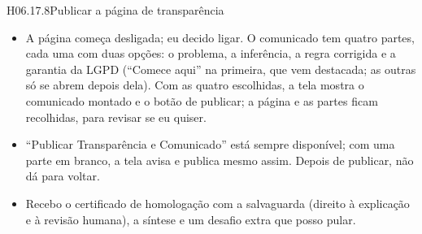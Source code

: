 \begin{historia}{H06.17.8}{Publicar a página de transparência}{\pronto}
\aceite
\begin{itemize}
  \item A página começa desligada; eu decido ligar. O comunicado tem quatro
    partes, cada uma com duas opções: o problema, a inferência, a regra
    corrigida e a garantia da LGPD (\enquote{Comece aqui} na primeira, que
    vem destacada; as outras só se abrem depois dela). Com as quatro
    escolhidas, a tela mostra o comunicado montado e o botão de publicar; a
    página e as partes ficam recolhidas, para revisar se eu quiser.
  \item \enquote{Publicar Transparência e Comunicado} está sempre
    disponível; com uma parte em branco, a tela avisa e publica mesmo assim.
    Depois de publicar, não dá para voltar.
  \item Recebo o certificado de homologação com a salvaguarda (direito à
    explicação e à revisão humana), a síntese e um desafio extra que posso
    pular.
\end{itemize}
\end{historia}

